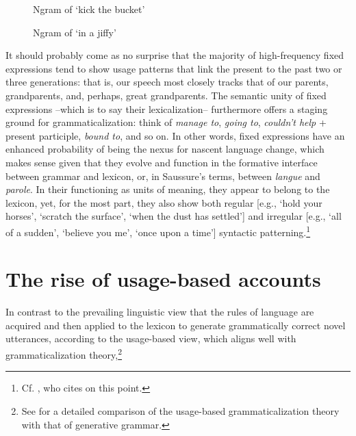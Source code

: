 \documentclass[output=paper]{langsci/langscibook}
\begin{document}
\begin{figure}
\caption{Ngram of ‘kick the bucket’} %
\label{fig:6:2}
\end{figure}

\begin{figure}
\caption{Ngram of ‘in a jiffy’} %
\label{fig:6:3}
\end{figure}

It should probably come as no surprise that the majority of high-frequency fixed expressions tend to show usage patterns that link the present to the past two or three generations: that is, our speech most closely tracks that of our parents, grandparents, and, perhaps, great grandparents. The semantic unity of fixed expressions –which is to say their lexicalization– furthermore offers a staging ground for grammaticalization: think of \textit{manage to}, \textit{going to}, \textit{couldn’t help} + present participle, \textit{bound to}, and so on. In other words, fixed expressions have an enhanced probability of being the nexus for nascent language change, which makes sense given that they evolve and function in the formative interface between grammar and lexicon, or, in Saussure’s terms, between \textit{langue} and \textit{parole}. In their functioning as units of meaning, they appear to belong to the lexicon, yet, for the most part, they also show both regular [e.g., ‘hold your horses’, ‘scratch the surface’, ‘when the dust has settled’] and irregular [e.g., ‘all of a sudden’, ‘believe you me’, ‘once upon a time’] syntactic patterning.\footnote{ \textrm{Cf. \citet[2--3]{wood_formulaic_2002}, who cites \citet[36]{richards_two_1983} on this point.}}

\section{The rise of usage-based accounts}

In contrast to the prevailing linguistic view that the rules of language are acquired and then applied to the lexicon to generate grammatically correct novel utterances, according to the usage-based view, which aligns well with grammaticalization theory,\footnote{ \textrm{See \citet{kibbee_evolution_2010} for a detailed comparison of the usage-based grammaticalization theory with that of generative grammar.}}
\end{document}
